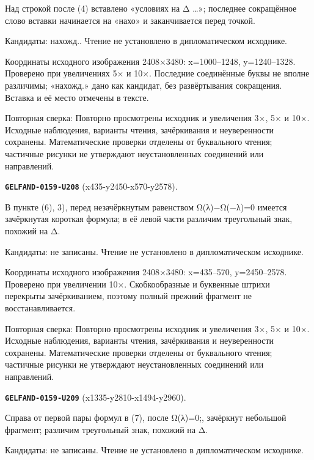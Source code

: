 Над строкой после (4) вставлено «условиях на Δ …»; последнее сокращённое слово вставки начинается на «нахо» и заканчивается перед точкой.\par
Кандидаты: нахожд.. Чтение не установлено в дипломатическом исходнике.\par
Координаты исходного изображения 2408×3480: x=1000–1248, y=1240–1328. Проверено при увеличениях 5× и 10×. Последние соединённые буквы не вполне различимы; «нахожд.» дано как кандидат, без развёртывания сокращения. Вставка и её место отмечены в тексте.\par
Повторная сверка: Повторно просмотрены исходник и увеличения 3×, 5× и 10×. Исходные наблюдения, варианты чтения, зачёркивания и неуверенности сохранены. Математические проверки отделены от буквального чтения; частичные рисунки не утверждают неустановленных соединений или направлений.\par\medskip
\par\noindent\leavevmode{}\label{GELFAND-0159-U208}\label{GELFAND-P001468:x435-y2450-x570-y2578}\textbf{\texttt{GELFAND-0159-U208}} (x435-y2450-x570-y2578).\nopagebreak[4]\par
В пункте (6), 3), перед незачёркнутым равенством Ω(λ)−Ω(−λ)=0 имеется зачёркнутая короткая формула; в её левой части различим треугольный знак, похожий на Δ.\par
Кандидаты: не записаны. Чтение не установлено в дипломатическом исходнике.\par
Координаты исходного изображения 2408×3480: x=435–570, y=2450–2578. Проверено при увеличении 10×. Скобкообразные и буквенные штрихи перекрыты зачёркиванием, поэтому полный прежний фрагмент не восстанавливается.\par
Повторная сверка: Повторно просмотрены исходник и увеличения 3×, 5× и 10×. Исходные наблюдения, варианты чтения, зачёркивания и неуверенности сохранены. Математические проверки отделены от буквального чтения; частичные рисунки не утверждают неустановленных соединений или направлений.\par\medskip
\par\noindent\leavevmode{}\label{GELFAND-0159-U209}\label{GELFAND-P001468:x1335-y2810-x1494-y2960}\textbf{\texttt{GELFAND-0159-U209}} (x1335-y2810-x1494-y2960).\nopagebreak[4]\par
Справа от первой пары формул в (7), после Ω(λ)=0;, зачёркнут небольшой фрагмент; различим треугольный знак, похожий на Δ.\par
Кандидаты: не записаны. Чтение не установлено в дипломатическом исходнике.\par
